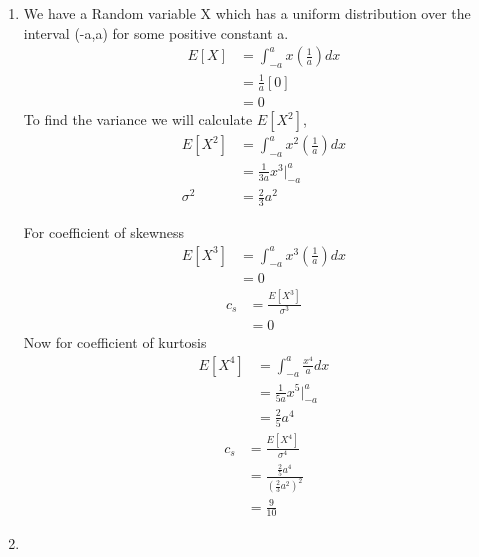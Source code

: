 \documentclass{article}
\begin{document}
\begin{enumerate}
\newpage
\item 
We have a Random variable X which has a uniform distribution over the interval (-a,a) for some positive constant a.
\begin{align*}
E[X]&=\int_{-a}^{a} x \left( \frac{1}{a} \right) dx\\
&=\frac{1}{a}[0]\\
&=0
\end{align*}
To find the variance we will calculate $E[X^2]$,
\begin{align*}
E[X^2]&=\int_{-a}^{a} x^2 \left( \frac{1}{a} \right) dx\\
&=\frac{1}{3a}x^3\Big|_{-a}^{a} \\
\sigma^2 &=\frac{2}{3}a^2
\end{align*}



 For coefficient of skewness
\begin{align*}
E[X^3] &=\int_{-a}^{a} x^3 \left( \frac{1}{a} \right) dx \\
&=0
\end{align*}
\begin{align*}
c_{s}&=\frac{E[X^3]}{\sigma^3}\\
&=0
\end{align*}
 Now for coefficient of kurtosis
\begin{align*}
E[X^4]&=\int_{-a}^{a}\frac{x^4}{a}dx\\
&=\frac{1}{5a}x^5\Big|_{-a}^{a} \\
&=\frac{2}{5}a^4
\end{align*}
\begin{align*}
c_{s}&=\frac{E[X^4]}{\sigma^4}\\
&=\frac{\frac{2}{5}a^4}{ \left( \frac{2}{3}a^2 \right)^2 }\\
&=\frac{9}{10}
\end{align*}

\vspace{2mm} 
\newpage
\item
     

\end{enumerate}
\end{document}
